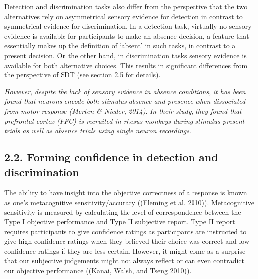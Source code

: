 \documentclass[]{article}
\begin{document}
Detection and discrimination tasks also differ from the perspective that
the two alternatives rely on asymmetrical sensory evidence for detection
in contrast to symmetrical evidence for discrimination. In a detection
task, virtually no sensory evidence is available for participants to
make an absence decision, a feature that essentially makes up the
definition of `absent' in such tasks, in contrast to a present decision.
On the other hand, in discrimination tasks sensory evidence is available
for both alternative choices. This results in significant differences
from the perspective of SDT (see section 2.5 for details).

\emph{However}, \emph{despite the lack of sensory evidence in absence
conditions}, \emph{it has been found that neurons encode both stimulus
absence and presence when dissociated from motor response (Merten \&
Nieder, 2014)}. \emph{In their study}, \emph{they found that prefrontal
cortex (PFC) is recruited in rhesus monkeys during stimulus present
trials as well as absence trials using single neuron recordings}.

\hypertarget{forming-confidence-in-detection-and-discrimination}{%
\subsection{2.2. Forming confidence in detection and
discrimination}\label{forming-confidence-in-detection-and-discrimination}}

The ability to have insight into the objective correctness of a response
is known as one's metacognitive sensitivity/accuracy ((Fleming et al.
2010)). Metacognitive sensitivity is measured by calculating the level
of correspondence between the Type I objective performance and Type II
subjective report. Type II report requires participants to give
confidence ratings as participants are instructed to give high
confidence ratings when they believed their choice was correct and low
confidence ratings if they are less certain. However, it might come as a
surprise that our subjective judgements might not always reflect or can
even contradict our objective performance ((Kanai, Walsh, and Tseng
2010)).
\end{document}
